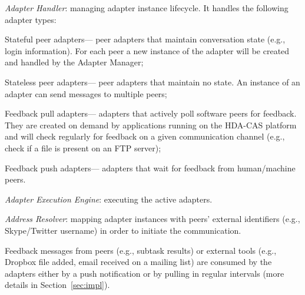     \begin{IEEEenumerate}
      \item \emph{Adapter Handler}: managing adapter instance lifecycle. It handles the following adapter types:  
            \begin{inparaenum}[\itshape i)]
              \item Stateful peer adapters--- peer adapters that maintain conversation state (e.g., login information). For each peer a new instance of the adapter will be created and handled by the Adapter Manager; 
              \item Stateless peer adapters--- peer adapters that maintain no state. An instance of an adapter can send messages to multiple peers; 
              \item Feedback pull adapters--- adapters that actively poll software peers for feedback. They are created on demand by applications running on the HDA-CAS platform and will check regularly for feedback on a given communication channel (e.g., check if a file is present on an FTP server);
              \item Feedback push adapters--- adapters that wait for feedback from human/machine peers. 
            \end{inparaenum}
      \item \emph{Adapter Execution Engine}: executing the active adapters.
      \item \emph{Address Resolver}: mapping adapter instances with peers' external identifiers (e.g., Skype/Twitter username) in order to initiate the communication.
    \end{IEEEenumerate}


    Feedback messages from peers (e.g., subtask results) or external tools (e.g., Dropbox file added, email received on a mailing list) are consumed by the adapters either by a push notification or by pulling in regular intervals (more details in Section~\ref{sec:impl}). 
    
